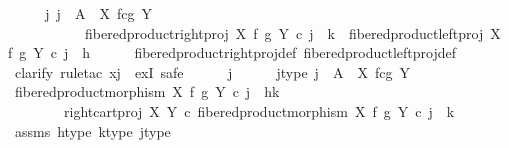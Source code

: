 \begin{isabellebody}
\ \ \isamarkupfalse%
\ \isamarkupfalse%
\ {\isachardoublequoteopen}{\isasymexists}j{\isachardot}{\kern0pt}\ j\ {\isacharcolon}{\kern0pt}\ A\ {\isasymrightarrow}\ X\ \isactrlbsub f\isactrlesub {\isasymtimes}\isactrlsub c\isactrlbsub g\isactrlesub \ Y\ {\isasymand}\isanewline
\ \ \ \ \ \ \ \ \ \ \ fibered{\isacharunderscore}{\kern0pt}product{\isacharunderscore}{\kern0pt}right{\isacharunderscore}{\kern0pt}proj\ X\ f\ g\ Y\ {\isasymcirc}\isactrlsub c\ j\ {\isacharequal}{\kern0pt}\ k\ {\isasymand}\ fibered{\isacharunderscore}{\kern0pt}product{\isacharunderscore}{\kern0pt}left{\isacharunderscore}{\kern0pt}proj\ X\ f\ g\ Y\ {\isasymcirc}\isactrlsub c\ j\ {\isacharequal}{\kern0pt}\ h{\isachardoublequoteclose}\isanewline
\ \ \ \ \isamarkupfalse%
\ fibered{\isacharunderscore}{\kern0pt}product{\isacharunderscore}{\kern0pt}right{\isacharunderscore}{\kern0pt}proj{\isacharunderscore}{\kern0pt}def\ fibered{\isacharunderscore}{\kern0pt}product{\isacharunderscore}{\kern0pt}left{\isacharunderscore}{\kern0pt}proj{\isacharunderscore}{\kern0pt}def\ \isanewline
\ \ \isamarkupfalse%
\ {\isacharparenleft}{\kern0pt}clarify{\isacharcomma}{\kern0pt}\ rule{\isacharunderscore}{\kern0pt}tac\ x{\isacharequal}{\kern0pt}j\ \ exI{\isacharcomma}{\kern0pt}\ safe{\isacharparenright}{\kern0pt}\isanewline
\ \ \ \ \isamarkupfalse%
\ j\isanewline
\ \ \ \ \isamarkupfalse%
\ j{\isacharunderscore}{\kern0pt}type{\isacharcolon}{\kern0pt}\ {\isachardoublequoteopen}j\ {\isacharcolon}{\kern0pt}\ A\ {\isasymrightarrow}\ X\ \isactrlbsub f\isactrlesub {\isasymtimes}\isactrlsub c\isactrlbsub g\isactrlesub \ Y{\isachardoublequoteclose}\isanewline
\isanewline
\ \ \ \ \isamarkupfalse%
\ {\isachardoublequoteopen}fibered{\isacharunderscore}{\kern0pt}product{\isacharunderscore}{\kern0pt}morphism\ X\ f\ g\ Y\ {\isasymcirc}\isactrlsub c\ j\ {\isacharequal}{\kern0pt}\ {\isasymlangle}h{\isacharcomma}{\kern0pt}k{\isasymrangle}\ {\isasymLongrightarrow}\isanewline
\ \ \ \ \ \ \ \ {\isacharparenleft}{\kern0pt}right{\isacharunderscore}{\kern0pt}cart{\isacharunderscore}{\kern0pt}proj\ X\ Y\ {\isasymcirc}\isactrlsub c\ fibered{\isacharunderscore}{\kern0pt}product{\isacharunderscore}{\kern0pt}morphism\ X\ f\ g\ Y{\isacharparenright}{\kern0pt}\ {\isasymcirc}\isactrlsub c\ j\ {\isacharequal}{\kern0pt}\ k{\isachardoublequoteclose}\isanewline
\ \ \ \ \ \ \isamarkupfalse%
\ assms\ h{\isacharunderscore}{\kern0pt}type\ k{\isacharunderscore}{\kern0pt}type\ j{\isacharunderscore}{\kern0pt}type\isanewline

\end{isabellebody}
